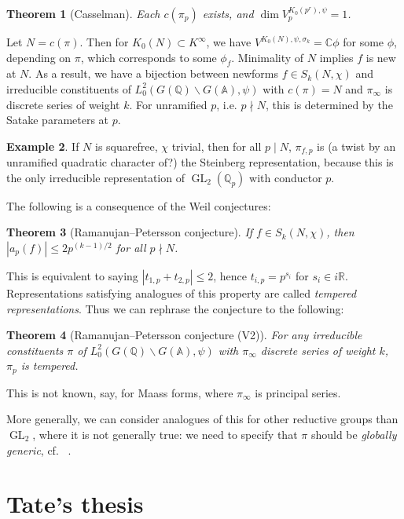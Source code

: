 \documentclass[11pt]{report}
\let\mbb\mathbb
\newcommand{\1}{\mathbbm 1}
\newcommand{\Q}{\mathbb{Q}}
\newcommand{\R}{\mathbb{R}}
\newcommand{\C}{\mathbb{C}}
\newcommand{\A}{\mbb A}
\DeclareMathOperator{\GL}{GL}
\theoremstyle{plain}
\newtheorem{thm}{Theorem}[section]
\newcounter{ex}
\theoremstyle{definition}
\newtheorem{example}[thm]{Example}
\theoremstyle{remark}
\numberwithin{equation}{section}
\begin{document}
\begin{thm}[Casselman]
Each $c(\pi_{p})$ exists, and $\dim V_{p}^{K_{0}(p^{r}),\psi} = 1$.
\end{thm}

Let $N = c(\pi)$. Then for $K_{0}(N) \subset K^{\infty}$, we have
$V^{K_{0}(N),\psi,\sigma_{k}} = \C\phi$ for some $\phi$, depending on
$\pi$, which corresponds to some $\phi_{f}$. Minimality of $N$ implies $f$
is new at $N$. As a result, we have a bijection between newforms $f \in
S_{k}(N,\chi)$ and irreducible constituents of $L^{2}_{0}(G(\Q)\backslash
G(\A),\psi)$ with $c(\pi) = N$ and $\pi_{\infty}$ is discrete series of weight
$k$. For unramified $p$, i.e. $p \nmid N$, this is determined by the
Satake parameters at $p$.

\begin{example}
  If $N$ is squarefree, $\chi$ trivial, then for all
  $p \mid N$, $\pi_{f,p}$ is (a twist by an unramified quadratic
  character of?) the Steinberg representation, because this is the only
  irreducible representation of $\GL_{2}(\Q_{p})$ with conductor $p$.
\end{example}

The following is a consequence of the Weil conjectures:
\begin{thm}[Ramanujan--Petersson conjecture]
  If $f \in S_{k}(N,\chi)$, then $|a_{p}(f)| \le 2p^{(k-1)/2}$ for all  $p \nmid N$.
\end{thm}
This is equivalent to saying $|t_{1,p} + t_{2,p}| \le 2$, hence
$t_{i,p}= p^{s_{i}}$ for $s_{i}\in i\R$. Representations satisfying
analogues of this property are called \emph{tempered
  representations}. Thus we can rephrase the conjecture to the
following:

\begin{thm}[Ramanujan--Petersson conjecture (V2)]
  For any irreducible constituents $\pi$ of $L^{2}_{0}(G(\Q)\backslash G(\A),\psi)$ with
  $\pi_{\infty}$ discrete series of weight $k$, $\pi_{p}$ is
  tempered. 
\end{thm}

This is not known, say, for Maass forms, where $\pi_{\infty}$ is principal series.

More generally, we can consider analogues of this for other reductive groups
than $\GL_{2}$, where it is not generally true: we need to specify
that $\pi$ should be \emph{globally generic}, cf.~ \cite{gan2023}.


\chapter{Tate's thesis}
\end{document}
